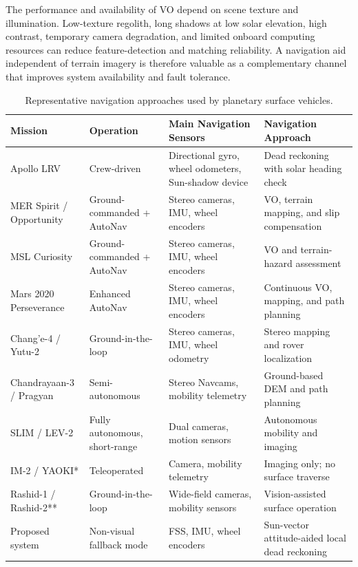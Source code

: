 \documentclass[]{IAC_style}
\begin{document}
The performance and availability of VO depend on scene texture and illumination. Low-texture regolith, long shadows at low solar elevation, high contrast, temporary camera degradation, and limited onboard computing resources can reduce feature-detection and matching reliability. A navigation aid independent of terrain imagery is therefore valuable as a complementary channel that improves system availability and fault tolerance.

\FloatBarrier
\begin{table}[!t]
\centering
\caption{Representative navigation approaches used by planetary surface vehicles.}
\label{tab:rover_navigation}
\scriptsize
\begin{tabularx}{\textwidth}{p{}p{}p{}X}
\toprule
\textbf{Mission} & \textbf{Operation} & \textbf{Main Navigation Sensors} & \textbf{Navigation Approach} \\
\midrule
Apollo LRV & Crew-driven & Directional gyro, wheel odometers, Sun-shadow device & Dead reckoning with solar heading check \\
MER Spirit / Opportunity & Ground-commanded + AutoNav & Stereo cameras, IMU, wheel encoders & VO, terrain mapping, and slip compensation \\
MSL Curiosity & Ground-commanded + AutoNav & Stereo cameras, IMU, wheel encoders & VO and terrain-hazard assessment \\
Mars 2020 Perseverance & Enhanced AutoNav & Stereo cameras, IMU, wheel encoders & Continuous VO, mapping, and path planning \\
Chang'e-4 / Yutu-2 & Ground-in-the-loop & Stereo cameras, IMU, wheel odometry & Stereo mapping and rover localization \\
Chandrayaan-3 / Pragyan & Semi-autonomous & Stereo Navcams, mobility telemetry & Ground-based DEM and path planning \\
SLIM / LEV-2 & Fully autonomous, short-range & Dual cameras, motion sensors & Autonomous mobility and imaging \\
IM-2 / YAOKI* & Teleoperated & Camera, mobility telemetry & Imaging only; no surface traverse \\
Rashid-1 / Rashid-2** & Ground-in-the-loop & Wide-field cameras, mobility sensors & Vision-assisted surface operation \\
Proposed system & Non-visual fallback mode & FSS, IMU, wheel encoders & Sun-vector attitude-aided local dead reckoning \\
\bottomrule
\end{tabularx}
\end{table}
\end{document}
